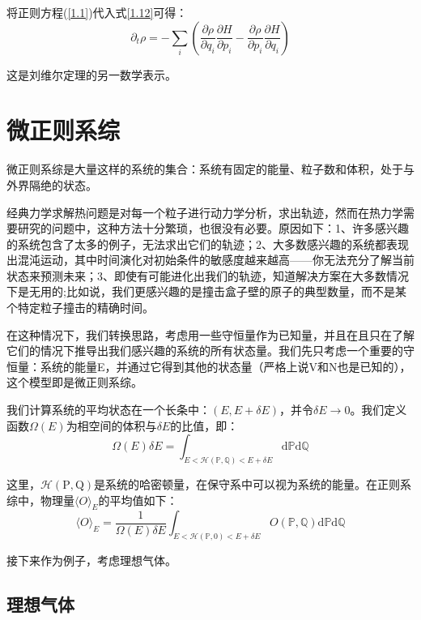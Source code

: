 \documentclass[UTF8]{ctexart}
\newcommand{\firstsection}{\subsection}
\newcommand{\dif}{\mathrm{d}}
\begin{document}
	将正则方程(\ref{1.1})代入式\ref{1.12}可得：
	\begin{equation}
	\partial_{t} \rho=-\sum_{i}\left(\frac{\partial \rho}{\partial q_{i}} \frac{\partial H}{\partial p_{i}}-\frac{\partial \rho}{\partial p_{i}} \frac{\partial H}{\partial q_{i}}\right)
	\end{equation}
	
	
\noindent 这是刘维尔定理的另一数学表示。
	
	\section{微正则系综}
	微正则系综是大量这样的系统的集合：系统有固定的能量、粒子数和体积，处于与外界隔绝的状态。
	
	经典力学求解热问题是对每一个粒子进行动力学分析，求出轨迹，然而在热力学需要研究的问题中，这种方法十分繁琐，也很没有必要。原因如下：1、许多感兴趣的系统包含了太多的例子，无法求出它们的轨迹；2、大多数感兴趣的系统都表现出混沌运动，其中时间演化对初始条件的敏感度越来越高——你无法充分了解当前状态来预测未来；3、即使有可能进化出我们的轨迹，知道解决方案在大多数情况下是无用的;比如说，我们更感兴趣的是撞击盒子壁的原子的典型数量，而不是某个特定粒子撞击的精确时间。
	
	在这种情况下，我们转换思路，考虑用一些守恒量作为已知量，并且在且只在了解它们的情况下推导出我们感兴趣的系统的所有状态量。我们先只考虑一个重要的守恒量：系统的能量E，并通过它得到其他的状态量（严格上说V和N也是已知的），这个模型即是微正则系综。
	
	我们计算系统的平均状态在一个长条中：$(E, E+\delta E)$，并令$\delta E \rightarrow 0$。我们定义函数$\Omega(E)$为相空间的体积与$\delta E$的比值，即：
	\begin{equation}
	\Omega(E) \delta E=\int_{E<\mathcal{H}(\mathbb{P}, \mathbb{Q})<E+\delta E} \mathrm{d} \mathbb{P} \mathrm{d} \mathbb{Q}
	\end{equation}
	
	\noindent 这里，$\mathcal{H}(\mathrm{P}, \mathrm{Q})$是系统的哈密顿量，在保守系中可以视为系统的能量。在正则系综中，物理量$\langle O\rangle_{E}$的平均值如下：
	\begin{equation}
	\langle O\rangle_{E}=\frac{1}{\Omega(E) \delta E} \int_{E<\mathcal{H}(\mathbb{P}, 0)<E+\delta E} O(\mathbb{P}, \mathbb{Q}) \dif \mathbb{P} \mathrm{d} \mathbb{Q}
	\end{equation}
	
	接下来作为例子，考虑理想气体。
	
	\firstsection{理想气体}
	
\end{document}
